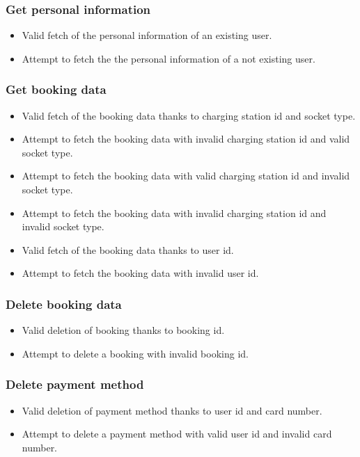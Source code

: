 \subsubsection{Get personal information}
\begin{itemize}
    \item Valid fetch of the personal information of an existing user.
    \item Attempt to fetch the the personal information of a not existing user.
\end{itemize}
\subsubsection{Get booking data}
\begin{itemize}
    \item Valid fetch of the booking data thanks to charging station id and socket type.
    \item Attempt to fetch the booking data with invalid charging station id and valid socket type.
    \item Attempt to fetch the booking data with valid charging station id and invalid socket type.
    \item Attempt to fetch the booking data with invalid charging station id and invalid socket type.
    \item Valid fetch of the booking data thanks to user id.
    \item Attempt to fetch the booking data with invalid user id.
\end{itemize}
\subsubsection{Delete booking data}
\begin{itemize}
    \item Valid deletion of booking thanks to booking id.
    \item Attempt to delete a booking with invalid booking id.
\end{itemize}
\subsubsection{Delete payment method}
\begin{itemize}
    \item Valid deletion of payment method thanks to user id and card number.
    \item Attempt to delete a payment method with valid user id and invalid card number.
\end{itemize}
